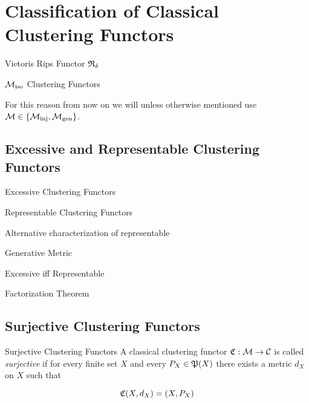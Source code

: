 \chapter{Classification of Classical Clustering Functors}

\begin{example}{Vietoris Rips Functor}{}
    $\Rf_\delta$
\end{example}

\begin{myremark}{$\iso$ Clustering Functors}{}
\end{myremark}

For this reason from now on we will unless otherwise mentioned use $\M \in \{\inj, \gen\}$.

\section{Excessive and Representable Clustering Functors}
\begin{definition}{Excessive Clustering Functors}{}
\end{definition}

\begin{definition}{Representable Clustering Functors}{}
\end{definition}

\begin{myremark}{}{}
    Alternative characterization of representable
\end{myremark}

\begin{definition}{Generative Metric}{}
\end{definition}

\begin{theorem}{Excessive iff Representable}{}
\end{theorem}

\begin{theorem}{}{}
    Factorization Theorem
\end{theorem}

\section{Surjective Clustering Functors}

\begin{definition}{Surjective Clustering Functors}{}
    A classical clustering functor $\Cf: \M \to \C$ is called \emph{surjective} if for every finite set $X$ and every $P_X \in \P(X)$ there exists a metric $d_X$ on $X$ such that

    \begin{equation*}
        \Cf(X,d_X) = (X,P_X)
    \end{equation*}

\end{definition}

